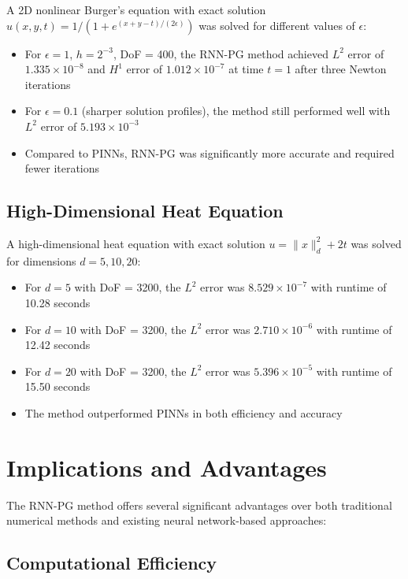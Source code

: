 \documentclass[11pt,a4paper]{article}
\begin{document}
A 2D nonlinear Burger's equation with exact solution $u(x,y,t) = 1/(1+e^{(x+y-t)/(2\epsilon)})$ was solved for different values of $\epsilon$:

\begin{itemize}
    \item For $\epsilon = 1$, $h = 2^{-3}$, DoF = 400, the RNN-PG method achieved $L^2$ error of $1.335 \times 10^{-8}$ and $H^1$ error of $1.012 \times 10^{-7}$ at time $t = 1$ after three Newton iterations
    \item For $\epsilon = 0.1$ (sharper solution profiles), the method still performed well with $L^2$ error of $5.193 \times 10^{-3}$
    \item Compared to PINNs, RNN-PG was significantly more accurate and required fewer iterations
\end{itemize}

\subsection{High-Dimensional Heat Equation}

A high-dimensional heat equation with exact solution $u = \|x\|^2_d + 2t$ was solved for dimensions $d = 5, 10, 20$:

\begin{itemize}
    \item For $d = 5$ with DoF = 3200, the $L^2$ error was $8.529 \times 10^{-7}$ with runtime of 10.28 seconds
    \item For $d = 10$ with DoF = 3200, the $L^2$ error was $2.710 \times 10^{-6}$ with runtime of 12.42 seconds
    \item For $d = 20$ with DoF = 3200, the $L^2$ error was $5.396 \times 10^{-5}$ with runtime of 15.50 seconds
    \item The method outperformed PINNs in both efficiency and accuracy
\end{itemize}

\section{Implications and Advantages}

The RNN-PG method offers several significant advantages over both traditional numerical methods and existing neural network-based approaches:

\subsection{Computational Efficiency}
\end{document}
